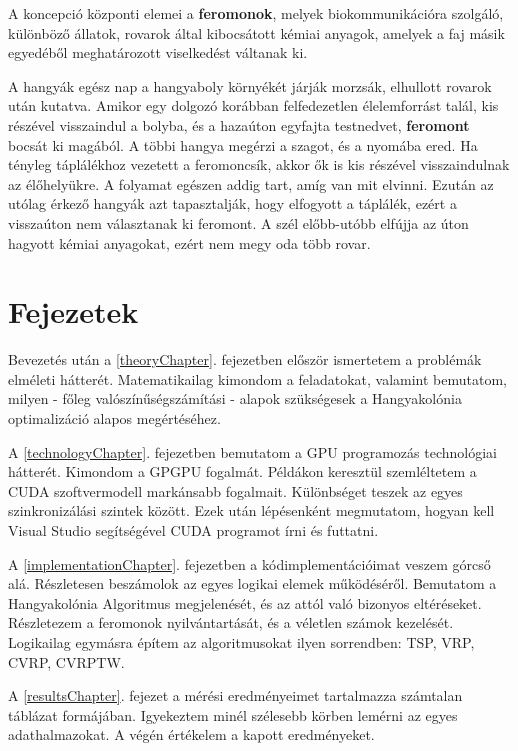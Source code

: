A koncepció központi elemei a \textbf{feromonok}, melyek biokommunikációra szolgáló, különböző állatok, rovarok által kibocsátott kémiai anyagok, amelyek a faj másik egyedéből meghatározott viselkedést váltanak ki.

A hangyák egész nap a hangyaboly környékét járják morzsák, elhullott rovarok után kutatva. Amikor egy dolgozó korábban felfedezetlen élelemforrást talál, kis részével visszaindul a bolyba, és a hazaúton egyfajta testnedvet, \textbf{feromont} bocsát ki magából. A többi hangya megérzi a szagot, és a nyomába ered. Ha tényleg táplálékhoz vezetett a feromoncsík, akkor ők is kis részével visszaindulnak az élőhelyükre. A folyamat egészen addig tart, amíg van mit elvinni. Ezután az utólag érkező hangyák azt tapasztalják, hogy elfogyott a táplálék, ezért a visszaúton nem választanak ki feromont. A szél előbb-utóbb elfújja az úton hagyott kémiai anyagokat, ezért nem megy oda több rovar.

\section{Fejezetek}
Bevezetés után a \ref{theoryChapter}. fejezetben először ismertetem a problémák elméleti hátterét. Matematikailag kimondom a feladatokat, valamint bemutatom, milyen - főleg valószínűségszámítási - alapok szükségesek a Hangyakolónia optimalizáció alapos megértéséhez.

A \ref{technologyChapter}. fejezetben bemutatom a GPU programozás technológiai hátterét. Kimondom a GPGPU fogalmát. Példákon keresztül szemléltetem a CUDA szoftvermodell markánsabb fogalmait. Különbséget teszek az egyes szinkronizálási szintek között. Ezek után lépésenként megmutatom, hogyan kell Visual Studio segítségével CUDA programot írni és futtatni.

A \ref{implementationChapter}. fejezetben a kódimplementációimat veszem górcső alá. Részletesen beszámolok az egyes logikai elemek működéséről. Bemutatom a Hangyakolónia Algoritmus megjelenését, és az attól való bizonyos eltéréseket. Részletezem a feromonok nyilvántartását, és a véletlen számok kezelését. Logikailag egymásra építem az algoritmusokat ilyen sorrendben: TSP, VRP, CVRP, CVRPTW.

A \ref{resultsChapter}. fejezet a mérési eredményeimet tartalmazza számtalan táblázat formájában. Igyekeztem minél szélesebb körben lemérni az egyes adathalmazokat. A végén értékelem a kapott eredményeket. 

